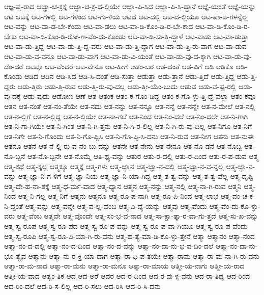 {ಆಜ್ಞ-ಪ್ತ-ರಾದ
ಆಜ್ಞಾ-ಚ-ಕ್ರಕ್ಕೆ
ಆಜ್ಞಾ-ಚ-ಕ್ರ-ದ-ಲ್ಲಿಯೇ
ಆಜ್ಞಾ-ಪಿ-ಸಿದ
ಆಜ್ಞಾ-ಪಿ-ಸಿ-ದ್ದಾನೆ
ಆಜ್ಞೆ-ಯಂತೆ
ಆಜ್ಞೆ-ಯನ್ನು
ಆಟ
ಆಟಕ್ಕೆ
ಆಟ-ಗಳಲ್ಲಿ
ಆಟ-ಗಳಿಂದ
ಆಟ-ಗು-ಳಿಯ
ಆಟದ
ಆಟ-ದಲ್ಲಿ
ಆಟ-ದ-ಲ್ಲಿಯೂ
ಆಟ-ಪಾ-ಟ-ಗಳನ್ನೆಲ್ಲ
ಆಟ-ವನ್ನು
ಆಟ-ವಾ-ಡ-ಬೇ-ಕೆಂದು
ಆಟ-ವಾ-ಡಲು
ಆಟ-ವಾ-ಡಿ-ಕೊಂ-ಡಿ-ರ-ಬೇ-ಕಾದ
ಆಟ-ವಾ-ಡಿ-ಕೊಂ-ಡಿ-ರ-ಬೇಕು
ಆಟ-ವಾ-ಡಿ-ಕೊಂ-ಡಿ-ರೋ-ಣ-ವೆಂ-ದು-ಕೊಂಡು
ಆಟ-ವಾ-ಡಿ-ಸು-ತ್ತಿ-ದ್ದಾಳೆ
ಆಟ-ವಾಡು
ಆಟ-ವಾ-ಡುತ್ತಾ
ಆಟ-ವಾ-ಡು-ತ್ತಿದ್ದ
ಆಟ-ವಾ-ಡು-ತ್ತಿ-ದ್ದ-ವರು
ಆಟ-ವಾ-ಡು-ತ್ತಿ-ದ್ದಾಗ
ಆಟ-ವಾ-ಡು-ತ್ತಿ-ರು-ವಾಗ
ಆಟ-ವಾ-ಡುವ
ಆಟ-ವಾ-ಡು-ವ-ವನೂ
ಆಟ-ವಾ-ಡು-ವಾಗ
ಆಟ-ವಾ-ಡು-ವಿ-ಯಂತೆ
ಆಟ-ವಾ-ಡು-ವು-ದ-ಕ್ಕಾಗಿ
ಆಟ-ವಾ-ಡು-ವು-ದೆಂ-ದರೆ
ಆಟವೂ
ಆಟ-ವೆಂದರೆ
ಆಟ-ವೇನೂ
ಆಟ-ಹೀಗೆ
ಆಡಂ-ಬರ
ಆಡ-ದಂತೆ
ಆಡ-ವಿಗೆ
ಆಡಿ
ಆಡಿಕೊ
ಆಡಿ-ಕೊಂಡು
ಆಡಿದ
ಆಡಿನ
ಆಡಿ-ಸಿದ
ಆಡಿ-ಸಿ-ದಂತೆ
ಆಡಿ-ಸುತ್ತಾ
ಆಡುತ್ತಾ
ಆಡು-ತ್ತಾನೆ
ಆಡು-ತ್ತಿದೆ
ಆಡು-ತ್ತಿದ್ದ
ಆಡು-ತ್ತಿ-ದ್ದರು
ಆಡು-ತ್ತಿರು
ಆಡು-ತ್ತಿ-ರುವ
ಆಡು-ತ್ತಿ-ರು-ವು-ದಲ್ಲ
ಆಡು-ತ್ತೀ-ಯೆಂ-ಬುದು
ಆಡುವ
ಆಡು-ವ-ಷ್ಟ-ರಲ್ಲಿ
ಆಡು-ವು-ದಕ್ಕೆ
ಆಡು-ವುದು
ಆಡೋಣ
ಆಣೆ
ಆತ
ಆತಂಕ
ಆತಂ-ಕ-ಗೊಂ-ಡಿದ್ದ
ಆತಂ-ಕ-ಗೊ-ಳ್ಳು-ತ್ತಿ-ದ್ದೆ-ವಲ್ಲಾ
ಆತಂ-ಕವೂ
ಆತನ
ಆತ-ನಂತೆ
ಆತ-ನಂ-ತೆಯೇ
ಆತ-ನದು
ಆತ-ನನ್ನು
ಆತ-ನನ್ನೂ
ಆತ-ನನ್ನೆ
ಆತ-ನನ್ನೇ
ಆತ-ನ-ಮೇಲೆ
ಆತ-ನಲ್ಲಿ
ಆತ-ನ-ಲ್ಲಿಗೆ
ಆತ-ನ-ಲ್ಲಿದ್ದ
ಆತ-ನ-ಲ್ಲಿಯೇ
ಆತ-ನಾ-ಗಲೆ
ಆತ-ನಿಂದ
ಆತ-ನಿಂ-ದಲೆ
ಆತ-ನಿಂ-ದಲೇ
ಆತ-ನಿ-ಗಾಗಿ
ಆತ-ನಿ-ಗಾ-ಗಿಯೇ
ಆತ-ನಿ-ಗಿಂತ
ಆತ-ನಿ-ಗಿ-ತ್ತನು
ಆತ-ನಿ-ಗಿ-ರ-ಲಿಲ್ಲ
ಆತ-ನಿ-ಗಿ-ರು-ವು-ದಿಲ್ಲ
ಆತ-ನಿಗೂ
ಆತ-ನಿಗೆ
ಆತ-ನಿಗೇ
ಆತ-ನಿ-ಗೊಂದು
ಆತ-ನಿ-ಗೊ-ಪ್ಪಿಸಿ
ಆತ-ನಿ-ಗೊ-ಪ್ಪಿ-ಸಿ-ದನು
ಆತ-ನಿ-ರುವ
ಆತ-ನೀಗ
ಆತನು
ಆತ-ನುಈ
ಆತನೂ
ಆತನೆ
ಆತ-ನೆ-ಲ್ಲಿ-ರು-ವ-ನೆಂ-ಬು-ದನ್ನು
ಆತನೇ
ಆತ-ನೇನು
ಆತ-ನೇನೂ
ಆತ-ನೊ-ಡನೆ
ಆತ-ನೊಬ್ಬ
ಆತ-ನೊ-ಬ್ಬನೆ
ಆತ-ನೊ-ಬ್ಬನೇ
ಆತ-ನೊಮ್ಮೆ
ಆತಿ-ಥ್ಯ-ವನ್ನು
ಆತುರ
ಆತು-ರ-ದಲ್ಲಿ
ಆತು-ರ-ದಿಂದ
ಆತು-ರ-ಪ-ಡುವ
ಆತ್ಮ
ಆತ್ಮ-ಕಥೆ
ಆತ್ಮ-ಕ್ಕಲ್ಲ
ಆತ್ಮಕ್ಕೂ
ಆತ್ಮಕ್ಕೆ
ಆತ್ಮ-ಗಳು
ಆತ್ಮ-ಜ್ಞಾನ
ಆತ್ಮ-ಜ್ಞಾ-ನ-ದಲ್ಲಿ
ಆತ್ಮ-ಜ್ಞಾ-ನ-ವ-ನ್ನಲ್ಲ
ಆತ್ಮ-ಜ್ಞಾ-ನ-ವನ್ನು
ಆತ್ಮ-ಜ್ಞಾ-ನಿ-ಗ-ಳಿಗೆ
ಆತ್ಮ-ಜ್ಞಾ-ನಿಯ
ಆತ್ಮ-ಜ್ಞಾ-ನಿ-ಯಾ-ಗಿದ್ದ
ಆತ್ಮ-ತ-ತ್ವ-ವನ್ನು
ಆತ್ಮ-ತ-ತ್ವ-ವೆಲ್ಲ
ಆತ್ಮ-ದೃಷ್ಟಿ
ಆತ್ಮ-ದೇ-ಹ-ನಾ-ಶಕ್ಕೆ
ಆತ್ಮ-ಧ-ರ್ಮ-ವಾದ
ಆತ್ಮ-ಧ್ಯಾನ
ಆತ್ಮನ
ಆತ್ಮ-ನನ್ನು
ಆತ್ಮ-ನಲ್ಲಿ
ಆತ್ಮ-ನಾ-ಗಿ-ರುವ
ಆತ್ಮನಿ
ಆತ್ಮ-ನಿಂದ
ಆತ್ಮ-ನಿ-ಗಲ್ಲ
ಆತ್ಮ-ನಿಗೆ
ಆತ್ಮನು
ಆತ್ಮನೂ
ಆತ್ಮ-ರೂ-ಪ-ನಾಗಿ
ಆತ್ಮ-ರೂ-ಪಿ-ನಿಂದ
ಆತ್ಮ-ಲಾಭ
ಆತ್ಮ-ವಂ-ಚ-ಕ-ನಿ-ದ್ದಂತೆ
ಆತ್ಮ-ವನ್ನು
ಆತ್ಮ-ವನ್ನೇ
ಆತ್ಮ-ವ-ಲ್ಲ-ವೆಂಬ
ಆತ್ಮ-ವಿ-ದ್ಯೆ-ಯನ್ನು
ಆತ್ಮವು
ಆತ್ಮ-ವೆಂದು
ಆತ್ಮ-ವೆಂ-ದು-ಕೊ-ಳ್ಳು-ವರು
ಆತ್ಮ-ವೆಂಬ
ಆತ್ಮವೇ
ಆತ್ಮ-ವೊಂದೇ
ಆತ್ಮ-ಸಂ-ಭ-ವ-ನಾದ
ಆತ್ಮ-ಸಾ-ಕ್ಷಾ-ತ್ಕಾ-ರ-ವಾ-ಗು-ತ್ತದೆ
ಆತ್ಮ-ಸು-ಖ-ವನ್ನು
ಆತ್ಮ-ಸ್ವ-ರೂಪ
ಆತ್ಮ-ಸ್ವ-ರೂ-ಪದ
ಆತ್ಮ-ಸ್ವ-ರೂ-ಪ-ವನ್ನು
ಆತ್ಮ-ಸ್ವ-ರೂ-ಪ-ವಾ-ಗಿಯೂ
ಆತ್ಮ-ಸ್ವ-ರೂ-ಪ-ವೆಂದು
ಆತ್ಮ-ಸ್ವ-ರೂಪಿ
ಆತ್ಮ-ಸ್ವ-ರೂ-ಪಿ-ಯಾ-ಗಿ-ರು-ವನು
ಆತ್ಮ-ಹ-ತ್ಯೆ-ಮಾ-ಡಿ-ಕೊ-ಳ್ಳು-ತ್ತೇನೆ
ಆತ್ಮಾ
ಆತ್ಮಾನಂ
ಆತ್ಮಾ-ನಂದ
ಆತ್ಮಾ-ನಂ-ದ-ದಲ್ಲಿ
ಆತ್ಮಾ-ನಂ-ದ-ದಿಂದ
ಆತ್ಮಾ-ನಂ-ದ-ವನ್ನು
ಆತ್ಮಾ-ನಂ-ದಾ-ನು-ಭ-ವ-ದಿಂ-ದಲೆ
ಆತ್ಮಾ-ನಂ-ದಾ-ನು-ಭೂ-ತ್ಯೈವ
ಆತ್ಮಾನು
ಆತ್ಮಾ-ನು-ರ-ಕ್ತಿ-ಯಾ-ದಾಗ
ಆತ್ಮಾ-ರಾ-ಧಿ-ಪ-ತಯೇ
ಆತ್ಮಾ-ರಾಮ
ಆತ್ಮಾ-ರಾ-ಮ-ನಾ-ಗಿ-ರು-ವನು
ಆತ್ಮಾ-ರಾ-ಮ-ನಾದ
ಆತ್ಮಾ-ರಾ-ಮನು
ಆತ್ಮಾ-ರಾ-ಮನೂ
ಆತ್ಮಾ-ರಾ-ಮಾಯ
ಆತ್ಮೀ-ಯ-ನಾಗು
ಆತ್ಮೀ-ಯ-ರಾದ
ಆತ್ಮೀ-ಯ-ವಾದ
ಆತ್ಯಂ-ತಿಕ
ಆದ
ಆದ-ಅರೆ
ಆದರ
ಆದ-ರ-ದಿಂದ
ಆದ-ರ-ವು-ಳ್ಳ-ವನು
ಆದ-ರಾ-ತಿಥ್ಯ
ಆದ-ರಿಂದ
ಆದ-ರಿಂ-ದಲೆ
ಆದ-ರಿ-ಸ-ಲಿಲ್ಲ
ಆದ-ರಿ-ಸಲು
ಆದ-ರಿಸಿ
ಆದ-ರಿ-ಸಿ-ದನು
}
